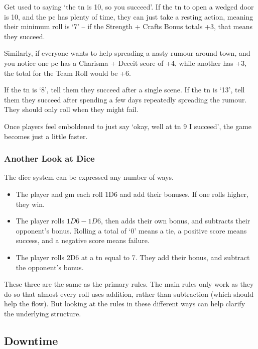 \begin{multicols}{2}
Get used to saying `the \gls{tn} is 10, so you succeed'.
If the \gls{tn} to open a wedged door is 10, and the \gls{pc} has plenty of time, they can just take a resting action, meaning their minimum roll is `7' -- if the Strength + Crafts Bonus totals +3, that means they succeed.

Similarly, if everyone wants to help spreading a nasty rumour around town, and you notice one \gls{pc} has a Charisma + Deceit score of +4, while another has +3, the total for the Team Roll would be +6.

If the \gls{tn} is `8', tell them they succeed after a single scene.
If the \gls{tn} is `13', tell them they succeed after spending a few days repeatedly spreading the rumour.
They should only roll when they might fail.

Once players feel emboldened to just say `okay, well at \gls{tn} 9 I succeed', the game becomes just a little faster.

\subsubsection{Another Look at Dice}

The dice system can be expressed any number of ways.

\begin{itemize}

  \item
  The player and \gls{gm} each roll 1D6 and add their bonuses.
  If one rolls higher, they win.
  \item
  The player rolls $1D6-1D6$, then adds their own bonus, and subtracts their opponent's bonus.
  Rolling a total of `0' means a tie, a positive score means success, and a negative score means failure.
  \item
  The player rolls 2D6 at a \gls{tn} equal to 7.
  They add their bonus, and subtract the opponent's bonus.

\end{itemize}

These three are the same as the primary rules.
The main rules only work as they do so that almost every roll uses addition, rather than subtraction (which should help the flow).
But looking at the rules in these different ways can help clarify the underlying structure.

\subsection{Downtime}


\end{multicols}
